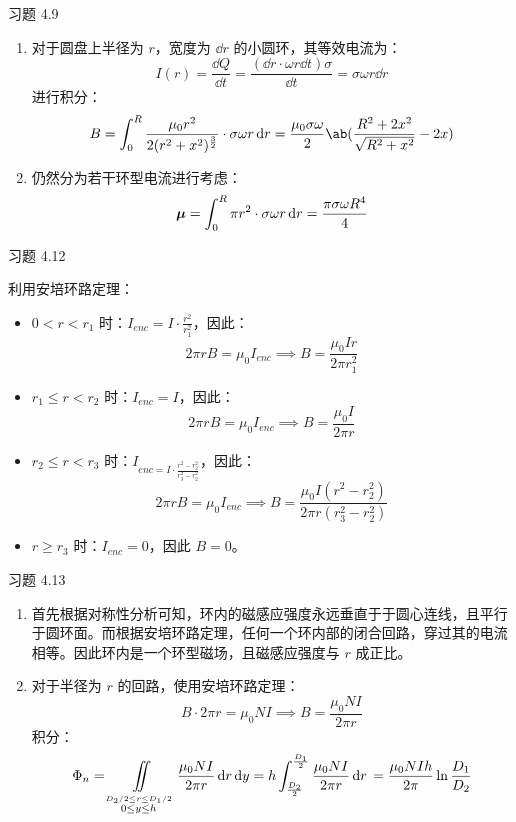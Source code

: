 \begin{problem}
	习题 4.9
	\begin{solution}
		\begin{enumerate}
			\item[\textbf{1)}] 对于圆盘上半径为 $r$，宽度为 $\dd{r}$ 的小圆环，其等效电流为：
			$$
			I(r) = \frac{\dd{Q}}{\dd{t}} = \frac{(\dd{r} \cdot \omega r \dd{t}) \sigma}{\dd{t}} = \sigma \omega r \dd{r}
			$$
			进行积分：
			$$
			B = \int_{0}^{R} \frac{\mu_0 r^2}{2 (r^2 + x^2)^{\frac{3}{2}}} \cdot \sigma \omega r \dd{r} = \frac{\mu_0 \sigma \omega}{2} \ab(\frac{R^2 + 2x^2}{\sqrt{R^2 + x^2}} - 2x)
			$$

			\item[\textbf{2)}] 仍然分为若干环型电流进行考虑：
			$$
			\boldsymbol{\mu} = \int_{0}^{R} \pi r^2 \cdot \sigma \omega r \dd{r} = \frac{\pi \sigma \omega R^4}{4}
			$$
		\end{enumerate}
	\end{solution}
\end{problem}

\begin{problem}
	习题 4.12
	\begin{solution}
		利用安培环路定理：
		\begin{itemize}
			\item $0 < r < r_1$ 时：$I_{enc} = I \cdot \frac{r^2}{r_1^2}$，因此：
			$$
			2\pi r B = \mu_0 I_{enc} \implies B = \frac{\mu_0 I r}{2 \pi r_1^2}
			$$
			\item $r_1 \le r < r_2$ 时：$I_{enc} = I$，因此：
			$$
			2\pi r B = \mu_0 I_{enc} \implies B = \frac{\mu_0 I}{2 \pi r}
			$$
			\item $r_2 \le r < r_3$ 时：$I_{enc = I \cdot \frac{r^2 - r_2^2}{r_3^2 - r_2^2}}$，因此：
			$$
			2\pi r B = \mu_0 I_{enc} \implies B = \frac{\mu_0 I (r^2 - r_2^2)}{2 \pi r (r_3^2 - r_2^2)}
			$$
			\item $r \ge r_3$ 时：$I_{enc} = 0$，因此 $B = 0$。
		\end{itemize}
	\end{solution}
\end{problem}

\begin{problem}
	习题 4.13
	\begin{solution}
		\begin{enumerate}
			\item[\textbf{1)}] 首先根据对称性分析可知，环内的磁感应强度永远垂直于于圆心连线，且平行于圆环面。而根据安培环路定理，任何一个环内部的闭合回路，穿过其的电流相等。因此环内是一个环型磁场，且磁感应强度与 $r$ 成正比。
			
			\item[\textbf{2)}] 对于半径为 $r$ 的回路，使用安培环路定理：
			$$
			B \cdot 2 \pi r = \mu_0 N I \implies B = \frac{\mu_0 N I}{2 \pi r}
			$$
			积分：
			$$
			\Phi_n = \iint\limits_{\stackrel{D_2 / 2 \le r \le D_1 / 2}{0 \le y \le h}} \frac{\mu_0 N I}{2 \pi r} \dd{r} \dd{y}
			= h \int_{\frac{D_2}{2}}^{\frac{D_1}{2}} \frac{\mu_0 N I}{2 \pi r} \dd{r} \\
			= \frac{\mu_0 N I h}{2 \pi} \ln \frac{D_1}{D_2}
			$$
		\end{enumerate}
	\end{solution}
\end{problem}

